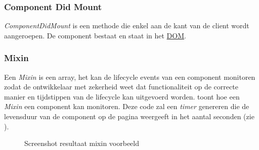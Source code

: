 	\subsubsection{Component Did Mount}
		
		\emph{ComponentDidMount} is een methode die enkel aan de kant van de client wordt aangeroepen. De component bestaat en staat in het \hyperref[dom]{DOM}.
	
	\subsubsection{Mixin}
		
		Een \emph{Mixin} is een array, het kan de lifecycle events van een component monitoren zodat de ontwikkelaar met zekerheid weet dat functionaliteit op de correcte manier en tijdstippen van de lifecycle kan uitgevoerd worden.  toont hoe een \emph{Mixin} een component kan monitoren. Deze code zal een \emph{timer} genereren die de levensduur van de component op de pagina weergeeft in het aantal seconden (zie ).
		
		
		\begin{figure}
			\centering
			\caption{Screenshot resultaat mixin voorbeeld}%
			\label{fig:timer}%
		\end{figure}
		
